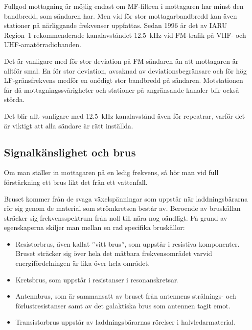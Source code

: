 Fullgod mottagning är möjlig endast om MF-filtren i mottagaren har
minst den bandbredd, som sändaren har.
Men vid för stor mottagarbandbredd kan även stationer på närliggande frekvenser
uppfattas.
Sedan 1996 är det av IARU Region~1 rekommenderade kanalavståndet
\qty{12,5}{\kilo\hertz} vid FM-trafik på VHF- och UHF-amatörradiobanden.

Det är vanligare med för stor deviation på FM-sändaren än att
mottagaren är alltför smal.
En för stor deviation, avsaknad av deviationsbegränsare och för hög
LF-gränsfrekvens medför en onödigt stor bandbredd på sändaren.
Motstationen får då mottagningssvårigheter och stationer på angränsande
kanaler blir också störda.

Det blir allt vanligare med \qty{12,5}{\kilo\hertz} kanalavstånd även för
repeatrar, varför det är viktigt att alla sändare är rätt inställda.

\subsection{Signalkänslighet och brus}
\label{signalkänslighet_brus}

Om man ställer in mottagaren på en ledig frekvens, så hör man vid full
förstärkning ett brus likt det från ett vattenfall.

Bruset kommer från de svaga växelspänningar som uppstår när
laddningsbärarna rör sig genom de material som strömkretsen består av.
Beroende av bruskällan sträcker sig frekvensspektrum från noll
till nära nog oändligt.
På grund av egenskaperna skiljer man mellan en rad specifika bruskällor:

\begin{itemize}
\item Resistorbrus, även kallat ''vitt brus'', som uppstår i resistiva
  komponenter.
  Bruset sträcker sig över hela det mätbara frekvensområdet varvid
  energifördelningen är lika över hela området.

\item Kretsbrus, som uppstår i resistanser i resonanskretsar.

\item Antennbrus, som är sammansatt av bruset från antennens
  strålnings- och förlustresistanser samt av det galaktiska brus som
  antennen tagit emot.

\item Transistorbrus uppstår av laddningsbärarnas rörelser i
  halvledarmaterial.
\end{itemize}

